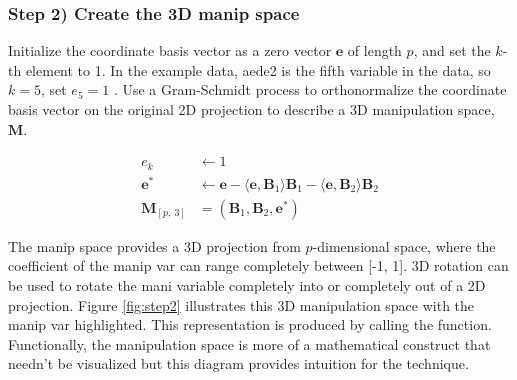 \hypertarget{step-2-create-the-3d-manip-space}{%
\subsubsection{Step 2) Create the 3D manip
space}\label{step-2-create-the-3d-manip-space}}

Initialize the coordinate basis vector as a zero vector \(\textbf{e}\)
of length \(p\), and set the \(k\)-th element to 1. In the example data,
aede2 is the fifth variable in the data, so \(k=5\), set \(e_5=1\) . Use
a Gram-Schmidt process to orthonormalize the coordinate basis vector on
the original 2D projection to describe a 3D manipulation space,
\(\textbf{M}\).

\begin{align*}
  e_k &\leftarrow 1 \\ 
  \textbf{e}^*   &\leftarrow \textbf{e} - \langle \textbf{e}, \textbf{B}_1 \rangle \textbf{B}_1 - \langle \textbf{e}, \textbf{B}_2 \rangle \textbf{B}_2 \\ 
  \textbf{M}_{[p,~3]} &= (\textbf{B}_1,\textbf{B}_2,\textbf{e}^*)
\end{align*}

The manip space provides a 3D projection from \(p\)-dimensional space,
where the coefficient of the manip var can range completely between
{[}-1, 1{]}. 3D rotation can be used to rotate the mani variable
completely into or completely out of a 2D projection. Figure
\ref{fig:step2} illustrates this 3D manipulation space with the manip
var highlighted. This representation is produced by calling the
 function. Functionally, the manipulation
space is more of a mathematical construct that needn't be visualized but
this diagram provides intuition for the technique.


